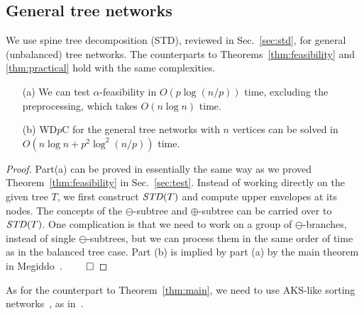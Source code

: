 \documentclass{llncs}
\newcommand{\QED}{\hfill$\qed$}
\begin{document}
{\subsection{General tree networks}\label{sec:general}
We use spine tree decomposition (STD),
reviewed in Sec.~\ref{sec:std},
 for general (unbalanced) tree networks.
The counterparts to Theorems~\ref{thm:feasibility} and \ref{thm:practical} hold
with the same complexities.
\begin{theorem}\label{thm:general1}
\begin{enumerate}
\item[(a)]
We can test $\alpha$-feasibility in $O(p\log (n/p))$ time,
excluding the preprocessing,
which takes $O(n \log n)$ time.
\item[(b)]
WD$p$C for the general tree networks with $n$ vertices can be solved in 
 $O(n \log n+p^2\log^2 (n/p))$ time.
\end{enumerate}
\end{theorem}
\begin{proof}
Part(a) can be proved in essentially the same way
as we proved Theorem~\ref{thm:feasibility} in Sec.~\ref{sec:test}.
Instead of working directly on the given tree $T$,
we first construct ${\it STD}(T)$ and compute upper envelopes at its nodes.
The concepts of the $\ominus$-subtree and $\oplus$-subtree can be carried
over to ${\it STD}(T)$.
One complication is that we need to work on a group of $\ominus$-branches,
instead of single $\ominus$-subtrees,
but we can process them in the same order of time as in the balanced tree case.
Part (b) is implied by part (a) by the main theorem in Megiddo~\cite{megiddo1979}.
\QED
\end{proof}

As for the counterpart to Theorem~\ref{thm:main}, 
we need to use AKS-like sorting networks~\cite{ajtai1983,goodrich2014,paterson1990,seiferas2009},
as in~\cite{cole1987}.

}
\end{document}
